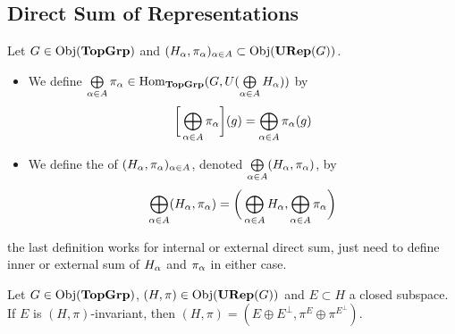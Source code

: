 \documentclass{book}
\begin{document}
	
	
	
	
	
	
	
	
	\subsection{Direct Sum of Representations}
	
	\begin{defn}
		Let $G \in \operatorname{Obj}(\operatorname*{\text{\textbf{TopGrp}}})$ and $(H_{\alpha}, \pi_{\alpha})_{\alpha \in A} \subset \operatorname{Obj}(\operatorname*{\text{\textbf{URep}}}(G))$. 
		\begin{itemize}
			\item We define $\bigoplus\limits_{\alpha \in A} \pi_{\alpha} \in \operatorname{Hom}_{\operatorname*{\text{\textbf{TopGrp}}}}(G, U(\bigoplus\limits_{\alpha \in A} H_{\alpha}))$ by 
			$$\bigg[ \bigoplus\limits_{\alpha \in A} \pi_{\alpha} \bigg](g) = \bigoplus\limits_{\alpha \in A} \pi_{\alpha}(g)$$
			\item We define the  of $(H_{\alpha}, \pi_{\alpha})_{\alpha \in A}$, denoted $\bigoplus\limits_{\alpha \in A} (H_{\alpha}, \pi_{\alpha})$, by 
			$$\bigoplus\limits_{\alpha \in A} (H_{\alpha}, \pi_{\alpha}) = \bigg(\bigoplus\limits_{\alpha \in A} H_{\alpha}, \bigoplus\limits_{\alpha \in A} \pi_{\alpha} \bigg)$$ 
		\end{itemize}
	\end{defn}
	
	\begin{note}
		 the last definition works for internal or external direct sum, just need to define inner or external sum of $H_{\alpha}$ and $\pi_{\alpha}$ in either case.  
	\end{note}
	
	\begin{ex}
		Let $G \in \operatorname{Obj}(\operatorname*{\text{\textbf{TopGrp}}})$, $(H, \pi) \in \operatorname{Obj}(\operatorname*{\text{\textbf{URep}}}(G))$ and $E \subset H$ a closed subspace. If $E$ is $(H, \pi)$-invariant, then $(H, \pi) = (E \oplus E^{\perp}, \pi^E \oplus \pi^{E^{\perp}})$.
	\end{ex}
	
\end{document}
